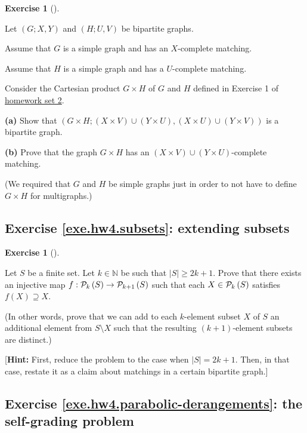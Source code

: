 \documentclass[numbers=enddot,12pt,final,onecolumn,notitlepage]{scrartcl}%
\newcounter{exer}
\theoremstyle{definition}
\newtheorem{exmp}[exer]{Exercise}
\newenvironment{exercise}[1][]
{\begin{exmp}[#1]\begin{leftbar}}
{\end{leftbar}\end{exmp}}
\newcommand{\NN}{\mathbb{N}}
\newcommand{\powset}[2][]{\ifthenelse{\equal{#2}{}}{\mathcal{P}\left(#1\right)}{\mathcal{P}_{#1}\left(#2\right)}}
\newcommand{\abs}[1]{\left| #1 \right|}
\newcommand{\tup}[1]{\left( #1 \right)}
\begin{document}
\begin{exercise} \label{exe.hw4.matching-product}
Let $\tup{G; X, Y}$ and $\tup{H; U, V}$ be bipartite graphs.

Assume that $G$ is a simple graph and has an $X$-complete matching.

Assume that $H$ is a simple graph and has a $U$-complete matching.

Consider the Cartesian product $G \times H$ of $G$ and $H$
defined in Exercise 1 of
\href{http://www.cip.ifi.lmu.de/~grinberg/t/17s/hw2s.pdf}{homework set 2}.

\textbf{(a)} Show that
$\tup{G \times H; \tup{X \times V} \cup \tup{Y \times U},
                  \tup{X \times U} \cup \tup{Y \times V}}$
is a bipartite graph.

\textbf{(b)} Prove that the graph $G \times H$ has an
$\tup{X \times V} \cup \tup{Y \times U}$-complete matching.
\end{exercise}

(We required that $G$ and $H$ be simple graphs just in order to not
have to define $G \times H$ for multigraphs.)

\subsection{Exercise \ref{exe.hw4.subsets}: extending subsets}

\begin{exercise} \label{exe.hw4.subsets}
Let $S$ be a finite set.
Let $k \in \NN$ be such that $\abs{S} \geq 2k+1$.
Prove that there exists an injective map
$f : \powset[k]{S} \to \powset[k+1]{S}$ such that
each $X \in \powset[k]{S}$ satisfies
$f \tup{X} \supseteq X$.

(In other words, prove that we can add to each $k$-element subset
$X$ of $S$ an additional element from $S \setminus X$ such that the
resulting $\tup{k+1}$-element subsets are distinct.)

[\textbf{Hint:} First, reduce the problem to the case when
$\abs{S} = 2k+1$.
Then, in that case, restate it as a claim about matchings in a
certain bipartite graph.]
\end{exercise}

\subsection{Exercise \ref{exe.hw4.parabolic-derangements}:
the self-grading problem}
\end{document}
